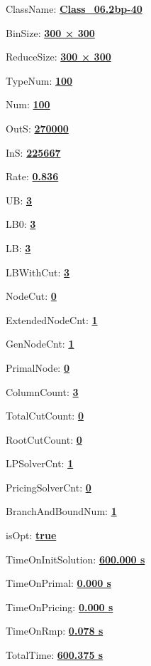 \documentclass[11pt]{article}
\begin{document}
\pagestyle{empty}


ClassName: \underline{\textbf{Class_06.2bp-40}}
\par
BinSize: \underline{\textbf{300 × 300}}
\par
ReduceSize: \underline{\textbf{300 × 300}}
\par
TypeNum: \underline{\textbf{100}}
\par
Num: \underline{\textbf{100}}
\par
OutS: \underline{\textbf{270000}}
\par
InS: \underline{\textbf{225667}}
\par
Rate: \underline{\textbf{0.836}}
\par
UB: \underline{\textbf{3}}
\par
LB0: \underline{\textbf{3}}
\par
LB: \underline{\textbf{3}}
\par
LBWithCut: \underline{\textbf{3}}
\par
NodeCut: \underline{\textbf{0}}
\par
ExtendedNodeCnt: \underline{\textbf{1}}
\par
GenNodeCnt: \underline{\textbf{1}}
\par
PrimalNode: \underline{\textbf{0}}
\par
ColumnCount: \underline{\textbf{3}}
\par
TotalCutCount: \underline{\textbf{0}}
\par
RootCutCount: \underline{\textbf{0}}
\par
LPSolverCnt: \underline{\textbf{1}}
\par
PricingSolverCnt: \underline{\textbf{0}}
\par
BranchAndBoundNum: \underline{\textbf{1}}
\par
isOpt: \underline{\textbf{true}}
\par
TimeOnInitSolution: \underline{\textbf{600.000 s}}
\par
TimeOnPrimal: \underline{\textbf{0.000 s}}
\par
TimeOnPricing: \underline{\textbf{0.000 s}}
\par
TimeOnRmp: \underline{\textbf{0.078 s}}
\par
TotalTime: \underline{\textbf{600.375 s}}
\par
\newpage
\end{document}
